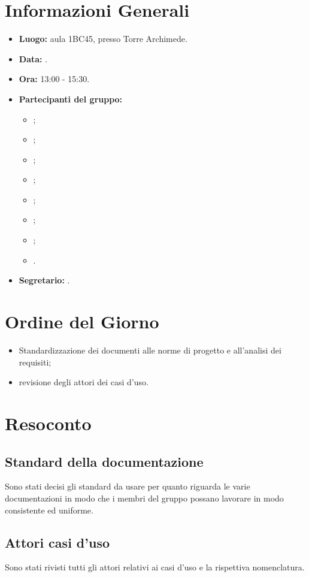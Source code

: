 \section{Informazioni Generali}
\begin{itemize}
\item \textbf{Luogo:} aula 1BC45, presso Torre Archimede.
\item \textbf{Data:} \Data.
\item \textbf{Ora:} 13:00 - 15:30.
\item \textbf{Partecipanti del gruppo:}
	\begin{itemize}
		\item \AT; 
		\item \BR;
		\item \CE; 
		\item \DF;
		\item \LD;
		\item \MC;
		\item \PF;
		\item \SE.
	\end{itemize} 
\item \textbf{Segretario:} \BR.
\end{itemize}

\section{Ordine del Giorno}
\begin{itemize}
	\item Standardizzazione dei documenti alle norme di progetto e all'analisi dei requisiti;
	\item revisione degli attori dei casi d'uso.
\end{itemize}


\section{Resoconto}
\subsection{Standard della documentazione}
Sono stati decisi gli standard da usare per quanto riguarda le varie documentazioni in modo che i membri del gruppo possano lavorare in modo consistente ed uniforme.\\

\subsection{Attori casi d'uso}
Sono stati rivisti tutti gli attori relativi ai casi d'uso e la rispettiva nomenclatura.\\

\clearpage